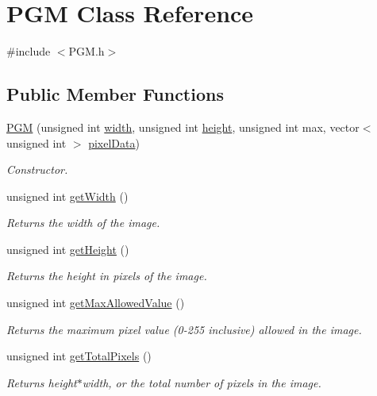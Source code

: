 \hypertarget{class_p_g_m}{}\section{P\+G\+M Class Reference}
\label{class_p_g_m}


{\ttfamily \#include $<$P\+G\+M.\+h$>$}

\subsection*{Public Member Functions}
\begin{DoxyCompactItemize}
\item 
\hyperlink{class_p_g_m_a22851f227dab894763d2f9e84022e616}{P\+G\+M} (unsigned int \hyperlink{class_p_g_m_ae1aba034876f972708f51869f9b96473}{width}, unsigned int \hyperlink{class_p_g_m_a84af85a78cdb18c3f4e40c9668e5144f}{height}, unsigned int max, vector$<$ unsigned int $>$ \hyperlink{class_p_g_m_ab195067d405dd4dcb8071a10d98bd31d}{pixel\+Data})
\begin{DoxyCompactList}\small\item\em Constructor. \end{DoxyCompactList}\item 
unsigned int \hyperlink{class_p_g_m_aebee6dce5ecd79b6d26d396a0c03a7df}{get\+Width} ()
\begin{DoxyCompactList}\small\item\em Returns the width of the image. \end{DoxyCompactList}\item 
unsigned int \hyperlink{class_p_g_m_ae4eb22cbacf56d37373467a3496e66c5}{get\+Height} ()
\begin{DoxyCompactList}\small\item\em Returns the height in pixels of the image. \end{DoxyCompactList}\item 
unsigned int \hyperlink{class_p_g_m_a445d28354d7674753f2e86987d54f0f1}{get\+Max\+Allowed\+Value} ()
\begin{DoxyCompactList}\small\item\em Returns the maximum pixel value (0-\/255 inclusive) allowed in the image. \end{DoxyCompactList}\item 
unsigned int \hyperlink{class_p_g_m_af33403715c3080a827f92a366f9ace15}{get\+Total\+Pixels} ()
\begin{DoxyCompactList}\small\item\em Returns height$\ast$width, or the total number of pixels in the image. \end{DoxyCompactList}\item 

\end{DoxyCompactItemize}
